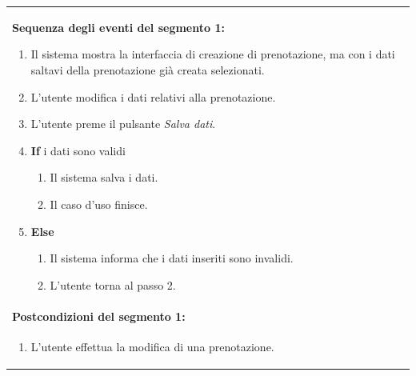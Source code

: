 \documentclass{article}
\begin{document}
\begin{table}[H]
\begin{tabular}{|p{\linewidth}|}
                        \vspace{-5pt} \\
                        \hline
                        \textbf{Sequenza degli eventi del segmento 1:}
                        \begin{enumerate}
                            \item Il sistema mostra la interfaccia di creazione di prenotazione, ma con i dati saltavi della prenotazione già creata selezionati. %
                            \item L'utente modifica i dati relativi alla prenotazione.
                            \item L'utente preme il pulsante \emph{Salva dati}.
                            \item \textbf{If} i dati sono validi
                            \begin{enumerate}
                                \item Il sistema salva i dati.
                                \item Il caso d'uso finisce.
                            \end{enumerate}
                            \item \textbf{Else}
                            \begin{enumerate}
                                \item Il sistema informa che i dati inseriti sono invalidi.
                                \item L'utente torna al passo 2.
                            \end{enumerate}
                        \end{enumerate} \\
                        \hline
                        \cellcolor{gray!20}
                        \textbf{Postcondizioni del segmento 1:} \\
                        \cellcolor{gray!20}
                        \begin{minipage}{\linewidth}
                            \begin{enumerate}
                                \item L'utente effettua la modifica di una prenotazione.
                            \end{enumerate}
                        \end{minipage} \\
                        \hline
                    \end{tabular}
                \end{table}
\end{document}
